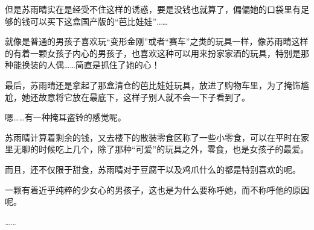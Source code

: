 但是苏雨晴实在是经受不住这样的诱惑，要是没钱也就算了，偏偏她的口袋里有足够的钱可以买下这盒国产版的“芭比娃娃”……

就像是普通的男孩子喜欢玩“变形金刚”或者“赛车”之类的玩具一样，像苏雨晴这样的有着一颗女孩子内心的男孩子，也喜欢这种可以用来扮家家酒的玩具，特别是那种能换装的人偶……简直是抓住了她的心！

最后，苏雨晴还是拿起了那盒清仓的芭比娃娃玩具，放进了购物车里，为了掩饰尴尬，她还故意将它放在最底下，这样子别人就不会一下子看到了。

嗯……有一种掩耳盗铃的感觉呢。

苏雨晴计算着剩余的钱，又去楼下的散装零食区称了一些小零食，可以在平时在家里无聊的时候吃上几个，除了那种“可爱”的玩具之外，零食，也是女孩子的最爱。

而且，还不仅限于甜食，苏雨晴对于豆腐干以及鸡爪什么的都是特别喜欢的呢。

一颗有着近乎纯粹的少女心的男孩子，这也是为什么要称呼她，而不称呼他的原因呢。

……
